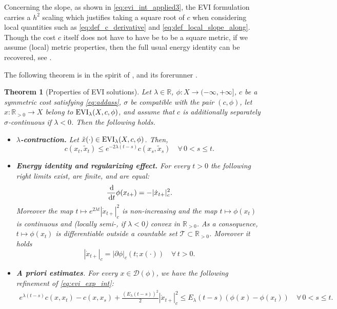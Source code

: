 \documentclass[reqno]{amsart}
\newcounter{results}[section]
\theoremstyle{plain}
\newtheorem{theorem}[results]{Theorem}
\theoremstyle{remark}
\theoremstyle{plain}
\numberwithin{equation}{section}
\theoremstyle{remark}
\newcommand{\R}{\mathbb{R}}
\newcommand{\de}{{\,\rm d}}
\newcommand{\dom}[1]{\mathscr{D}(#1)}
\DeclareMathOperator{\EVI}{{\rm EVI}}
\begin{document}
Concerning the slope, as shown in \eqref{eq:evi_int_applied3}, the EVI formulation carries a $h^2$ scaling which justifies taking a square root of $c$ when considering local quantities such as \eqref{eq:def_c_derivative} and \eqref{eq:def_local_slope_along}. Though the cost $c$ itself does not have to have be to be a square metric, if we assume (local) metric properties, then the full usual energy identity can be recovered, see .


The following theorem is in the spirit of \cite[Theorem 3.5]{MuratoriSavare}, and its forerunner \cite[Theorem 6.9]{Danieri2014}.


\begin{theorem}[Properties of  EVI solutions]\label{thm:eviprop} Let $\lambda \in \R$, $\phi:X\to (-\infty, + \infty]$,  $c$ be a symmetric cost satisfying \eqref{eq:addass},  $\sigma$ be compatible with the pair $(c,\phi)$, let $x:\R_{>0} \to X$ belong to  $ \EVI_\lambda(X,c,\phi)$, and assume that $c$ is additionally separately $\sigma$-continuous if $\lambda<0$. Then the following holds.
\begin{itemize}[leftmargin=5mm]
    \item  {\bf $\lambda$-contraction. }Let $\tilde x(\cdot)\in \EVI_\lambda(X,c,\phi)$. Then,  
    \begin{equation}
    c(x_t,\tilde x_t) \le e^{-2\lambda (t-s)} c(x_s,\tilde x_s) \quad \forall \, 0 < s \le t. \label{eq:lambda_contraction}
    \end{equation}
    \item {\bf Energy identity and regularizing effect.}  For every $t>0$ the following right limits exist, are finite, and are equal:
    \begin{equation}\label{eq:energy_identity}
    \frac{\de}{\de t}\phi(x_{t+})= -  |\dot x_{t+ }|_c^2.   \end{equation}
     Moreover the map $t\mapsto e^{2\lambda t}|\dot x_{t+}|^2_c$ is non-increasing and the map $t \mapsto \phi(x_t)$ is continuous and (locally semi-, if $\lambda <0$) convex in  $\R_{>0}$.  As a consequence, $t \mapsto \phi(x_t)$ is differentiable outside a countable set $\mathcal{T} \subset  \R_{>0}$. Moreover it holds
     \begin{equation}\label{eq:locorsl}
            |\dot x_{t+ }|_c = |\partial \phi|_c(t;x(\cdot)) \quad \forall \, t>0.
     \end{equation}
    \item {\bf A priori estimates}. For every $x\in\dom{\phi}$, we have the following refinement of \eqref{eq:evi_exp_int}:  
    \begin{align}
    e^{\lambda(t-s)}c(x,x_t)-c(x,x_s) + \frac{(E_\lambda(t-s))^2}{2}|\dot x_{t+ }|_c^2 
    \le E_\lambda(t-s)\left(\phi(x)-\phi(x_t)\right) \quad \forall \, 0 < s \le t.    \label{eq:evi_exp_int_ref}
    \end{align}
    

\end{itemize}
\end{theorem}
\end{document}
